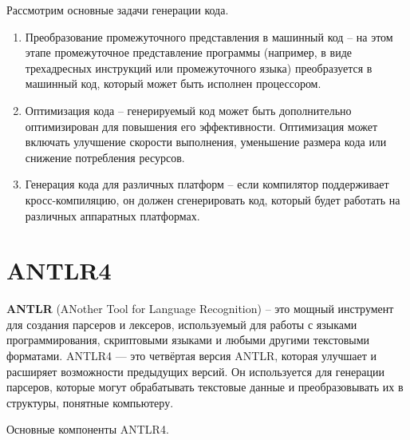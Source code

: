 Рассмотрим основные задачи генерации кода.
\begin{enumerate}
  \item Преобразование промежуточного представления в машинный код -- на этом этапе промежуточное представление программы (например, в виде трехадресных инструкций или промежуточного языка) преобразуется в машинный код, который может быть исполнен процессором.
  \item Оптимизация кода -- генерируемый код может быть дополнительно оптимизирован для повышения его эффективности. Оптимизация может включать улучшение скорости выполнения, уменьшение размера кода или снижение потребления ресурсов.
  \item Генерация кода для различных платформ -- если компилятор поддерживает кросс-компиляцию, он должен сгенерировать код, который будет работать на различных аппаратных платформах.
\end{enumerate}


\section{ANTLR4}

\textbf{ANTLR} (ANother Tool for Language Recognition) \cite{antlr4} -- это мощный инструмент для создания парсеров и лексеров, используемый для работы с языками программирования, скриптовыми языками и любыми другими текстовыми форматами. ANTLR4 — это четвёртая версия ANTLR, которая улучшает и расширяет возможности предыдущих версий. Он используется для генерации парсеров, которые могут обрабатывать текстовые данные и преобразовывать их в структуры, понятные компьютеру.

Основные компоненты ANTLR4.


